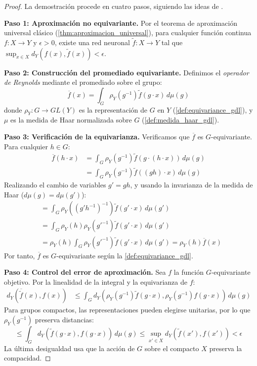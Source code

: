 \begin{proof}
La demostración procede en cuatro pasos, siguiendo las ideas de \citet{yarotsky2022}.

\textbf{Paso 1: Aproximación no equivariante.}
Por el teorema de aproximación universal clásico (\autoref{thm:aproximacion_universal}), para cualquier función continua $f: X \to Y$ y $\epsilon > 0$, existe una red neuronal $\tilde{f}: X \to Y$ tal que $\sup_{x \in X} d_Y(f(x), \tilde{f}(x)) < \epsilon$.

\textbf{Paso 2: Construcción del promediado equivariante.}
Definimos el \textit{operador de Reynolds} mediante el promediado sobre el grupo:
\[
\overline{f}(x) = \int_G \rho_Y(g^{-1}) \tilde{f}(g \cdot x) \, d\mu(g)
\]
donde $\rho_Y: G \to GL(Y)$ es la representación de $G$ en $Y$ (\autoref{def:equivariance_gdl}), y $\mu$ es la medida de Haar normalizada sobre $G$ (\autoref{def:medida_haar_gdl}).

\textbf{Paso 3: Verificación de la equivarianza.}
Verificamos que $\overline{f}$ es $G$-equivariante. Para cualquier $h \in G$:
\begin{align*}
\overline{f}(h \cdot x) &= \int_G \rho_Y(g^{-1}) \tilde{f}(g \cdot (h \cdot x)) \, d\mu(g) \\
&= \int_G \rho_Y(g^{-1}) \tilde{f}((gh) \cdot x) \, d\mu(g)
\end{align*}
Realizando el cambio de variables $g' = gh$, y usando la invarianza de la medida de Haar ($d\mu(g) = d\mu(g')$):
\begin{align*}
&= \int_G \rho_Y((g'h^{-1})^{-1}) \tilde{f}(g' \cdot x) \, d\mu(g') \\
&= \int_G \rho_Y(h)\rho_Y(g'^{-1}) \tilde{f}(g' \cdot x) \, d\mu(g') \\
&= \rho_Y(h) \int_G \rho_Y(g'^{-1}) \tilde{f}(g' \cdot x) \, d\mu(g') = \rho_Y(h) \overline{f}(x)
\end{align*}
Por tanto, $\overline{f}$ es $G$-equivariante según la \autoref{def:equivariance_gdl}.

\textbf{Paso 4: Control del error de aproximación.}
Sea $f$ la función $G$-equivariante objetivo. Por la linealidad de la integral y la equivarianza de $f$:
\begin{align*}
d_Y(\overline{\tilde{f}}(x), f(x)) &\leq \int_G d_Y(\rho_Y(g^{-1}) \tilde{f}(g \cdot x), \rho_Y(g^{-1}) f(g \cdot x)) \, d\mu(g)
\end{align*}
Para grupos compactos, las representaciones pueden elegirse unitarias, por lo que $\rho_Y(g^{-1})$ preserva distancias:
\[
\leq \int_G d_Y(\tilde{f}(g \cdot x), f(g \cdot x)) \, d\mu(g) \leq \sup_{x' \in X} d_Y(\tilde{f}(x'), f(x')) < \epsilon
\]
La última desigualdad usa que la acción de $G$ sobre el compacto $X$ preserva la compacidad.
\end{proof}

